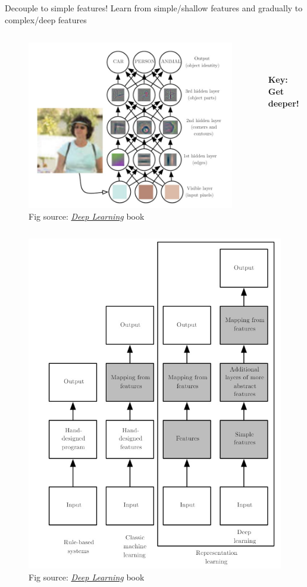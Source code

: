\documentclass{../TexTemplate/myslide}
\begin{document}
\begin{frame}{Decouple to simple features!}
Learn from simple/shallow features and gradually to complex/deep features
\begin{columns}
\begin{column}{0.6\linewidth}
\begin{figure}
\centering
\includegraphics[width=\linewidth]{fig/dl_model.jpg}
\caption*{\scriptsize Fig source: \href{https://www.deeplearningbook.org/contents/intro.html}{\emph{Deep Learning}} book}
\end{figure}
\end{column}
\begin{column}{0.4\linewidth}
\quad\\
\quad\\
\begin{center}
\textbf{Key: Get deeper!}
\end{center}
\end{column}
\end{columns}
\end{frame}

\begin{frame}
\begin{figure}
\centering
\includegraphics[width=0.5\linewidth]{fig/catalog.jpg}
\caption*{\scriptsize Fig source: \href{https://www.deeplearningbook.org/contents/intro.html}{\emph{Deep Learning}} book}
\end{figure}
\end{frame}
\end{document}
